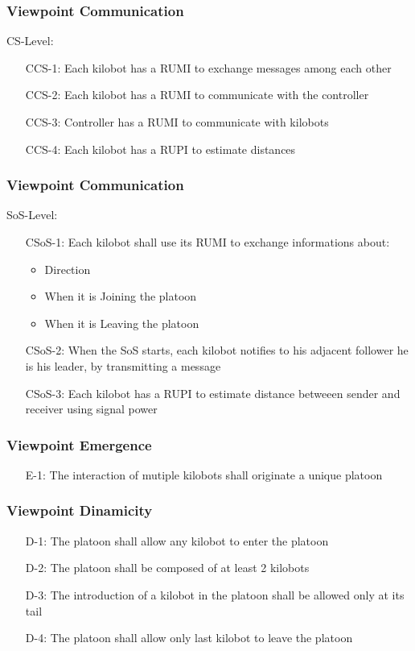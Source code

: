 \documentclass{beamer}
\begin{document}
\begin{frame}
\frametitle{Viewpoint Communication}
CS-Level:

\begin{enumerate}[align=left]
	\item[CCS-1:] Each kilobot has a RUMI to exchange messages among each other
	\item[CCS-2:] Each kilobot has a RUMI to communicate with the controller
	\item[CCS-3:] Controller has a RUMI to communicate with kilobots
	\item[CCS-4:] Each kilobot has a RUPI to estimate distances
\end{enumerate}
\end{frame}

\begin{frame}
\frametitle{Viewpoint Communication}
SoS-Level:

\begin{enumerate}[align=left]
	\item[CSoS-1:] Each kilobot shall use its RUMI to exchange informations about:
	\begin{itemize}
		\item Direction
		\item When it is Joining the platoon
		\item When it is Leaving the platoon
	\end{itemize}
	\item[CSoS-2:] When the SoS starts, each kilobot notifies to his adjacent follower he is his leader, by transmitting a message
	\item[CSoS-3:] Each kilobot has a RUPI to estimate distance betweeen sender and receiver using signal power
\end{enumerate}
\end{frame}

\begin{frame}
\frametitle{Viewpoint Emergence}
\begin{enumerate}[align=left]
	\item[E-1:] The interaction of mutiple kilobots shall originate a unique platoon
\end{enumerate}
\end{frame}

\begin{frame}
\frametitle{Viewpoint Dinamicity}
\begin{enumerate}[align=left]
	\item[D-1:] The platoon shall allow any kilobot to enter the platoon
	\item[D-2:] The platoon shall be composed of at least 2 kilobots
	\item[D-3:] The introduction of a kilobot in the platoon shall be allowed only at its tail
	\item[D-4:] The platoon shall allow only last kilobot to leave the platoon
\end{enumerate}
\end{frame}
\end{document}
